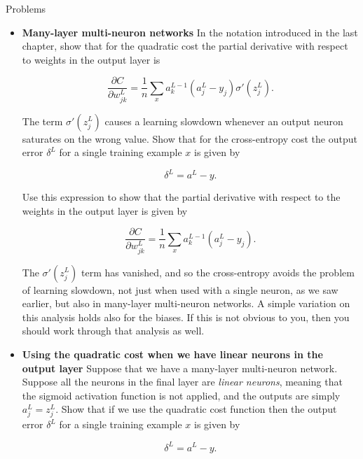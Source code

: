 \begin{exerciseBox}{Problems}


\begin{itemize}

\item 
\textbf{Many-layer multi-neuron networks} In the notation introduced in the last chapter, show that for the quadratic cost the partial derivative with respect to weights in the output layer is


\begin{equation}
\frac{\partial C}{\partial w^L_{jk}} = \frac{1}{n} \sum_x a^{L-1}_k (a^L_j-y_j) \sigma'(z^L_j).
\tag{65}
\end{equation}

The term $\sigma'(z^L_j)$ causes a learning slowdown whenever an output neuron saturates on the wrong value. Show that for the cross-entropy cost the output error $\delta^L$ for a single training example $x$ is given by


\begin{equation}
\delta^L = a^L-y.
\tag{66}
\end{equation}

Use this expression to show that the partial derivative with respect to the weights in the output layer is given by


\begin{equation}
\frac{\partial C}{\partial w^L_{jk}} = \frac{1}{n} \sum_x a^{L-1}_k (a^L_j-y_j).
\tag{67}
\end{equation}

The $\sigma'(z^L_j)$ term has vanished, and so the cross-entropy avoids the problem of learning slowdown, not just when used with a single neuron, as we saw earlier, but also in many-layer multi-neuron networks. A simple variation on this analysis holds also for the biases. If this is not obvious to you, then you should work through that analysis as well.

\item 
\textbf{Using the quadratic cost when we have linear neurons in the output layer} Suppose that we have a many-layer multi-neuron network. Suppose all the neurons in the final layer are \emph{linear neurons}, meaning that the sigmoid activation function is not applied, and the outputs are simply $a^L_j = z^L_j$. Show that if we use the quadratic cost function then the output error $\delta^L$ for a single training example $x$ is given by


\begin{equation}
\delta^L = a^L-y.
\tag{68}
\end{equation}


\end{itemize}
\end{exerciseBox}
